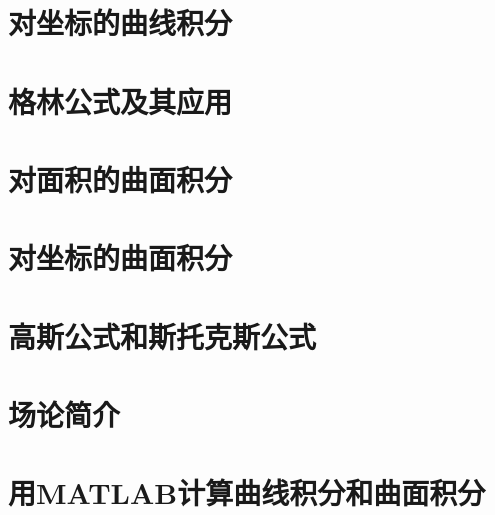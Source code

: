 \section{对坐标的曲线积分}

\section{格林公式及其应用}

\section{对面积的曲面积分}

\section{对坐标的曲面积分}

\section{高斯公式和斯托克斯公式}

\section{场论简介}

\section{用MATLAB计算曲线积分和曲面积分}